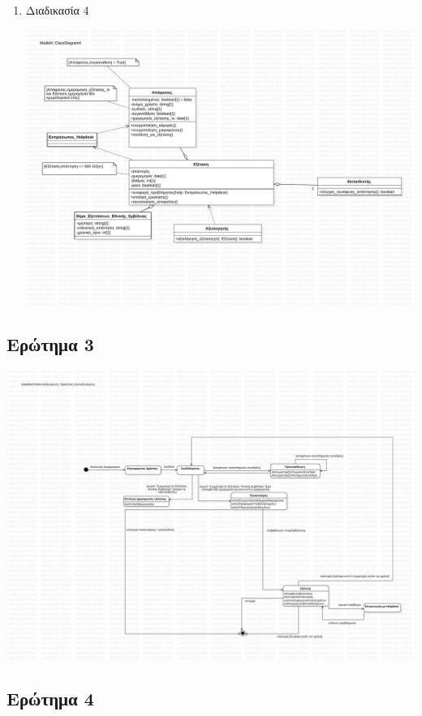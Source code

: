 \documentclass[a4paper, titlepage, twoside]{article}
\begin{document}
\begin{enumerate}
\begin{center}
\end{center}
\item Διαδικασία 4
\label{sec:orgdbdbd47}
\begin{center}
\includegraphics[width=.9\linewidth]{class_4.pdf}
\end{center}
\end{enumerate}

\subsection{Ερώτημα 3}
\label{sec:org5ec6946}

\begin{center}
\includegraphics[width=.9\linewidth]{state.pdf}
\end{center}

\subsection{Ερώτημα 4}
\label{sec:org24fc5ab}
\end{document}
